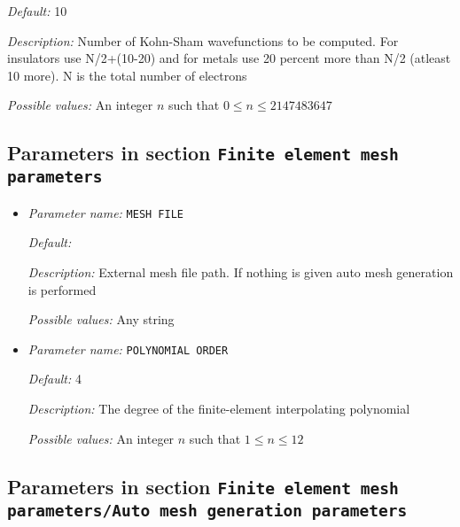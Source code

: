 \begin{itemize}
{\it Default:} 10


{\it Description:} Number of Kohn-Sham wavefunctions to be computed. For insulators use N/2+(10-20) and for metals use 20 percent more than N/2 (atleast 10 more). N is the total number of electrons


{\it Possible values:} An integer $n$ such that $0\leq n \leq 2147483647$
\end{itemize}

\subsection{Parameters in section \tt Finite element mesh parameters}
\label{parameters:Finite_20element_20mesh_20parameters}

\begin{itemize}
\item {\it Parameter name:} {\tt MESH FILE}
\label{parameters:Finite element mesh parameters/MESH FILE}
\label{parameters:Finite_20element_20mesh_20parameters/MESH_20FILE}


{\it Default:} 


{\it Description:} External mesh file path. If nothing is given auto mesh generation is performed


{\it Possible values:} Any string
\item {\it Parameter name:} {\tt POLYNOMIAL ORDER}
\label{parameters:Finite element mesh parameters/POLYNOMIAL ORDER}
\label{parameters:Finite_20element_20mesh_20parameters/POLYNOMIAL_20ORDER}


{\it Default:} 4


{\it Description:} The degree of the finite-element interpolating polynomial


{\it Possible values:} An integer $n$ such that $1\leq n \leq 12$
\end{itemize}



\subsection{Parameters in section \tt Finite element mesh parameters/Auto mesh generation parameters}
\label{parameters:Finite_20element_20mesh_20parameters/Auto_20mesh_20generation_20parameters}

